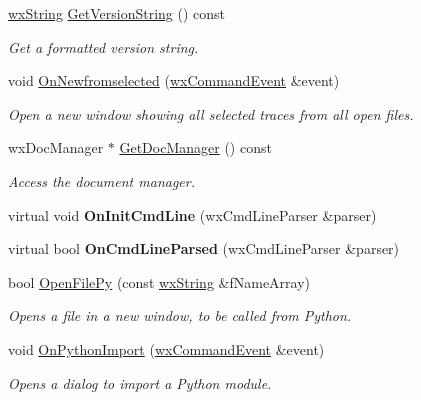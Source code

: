 \begin{DoxyCompactItemize}
\hyperlink{classwxString}{wxString} \hyperlink{classwxStfApp_a3e2dfcb798c3451a31b84ec712ae52fd}{GetVersionString} () const 
\begin{DoxyCompactList}\small\item\em Get a formatted version string. \item\end{DoxyCompactList}\item 
void \hyperlink{classwxStfApp_ad84ab3a7bc030ba2b1a03924f8e90386}{OnNewfromselected} (\hyperlink{classwxCommandEvent}{wxCommandEvent} \&event)
\begin{DoxyCompactList}\small\item\em Open a new window showing all selected traces from all open files. \item\end{DoxyCompactList}\item 
wxDocManager $\ast$ \hyperlink{classwxStfApp_a5fad31f2760593bec972912461e2e2e4}{GetDocManager} () const 
\begin{DoxyCompactList}\small\item\em Access the document manager. \item\end{DoxyCompactList}\item 
\hypertarget{classwxStfApp_a6a012628e86f748873c91ab039373fc8}{
virtual void {\bfseries OnInitCmdLine} (wxCmdLineParser \&parser)}
\label{classwxStfApp_a6a012628e86f748873c91ab039373fc8}

\item 
\hypertarget{classwxStfApp_a6bbcf577566590abb524e842692688c3}{
virtual bool {\bfseries OnCmdLineParsed} (wxCmdLineParser \&parser)}
\label{classwxStfApp_a6bbcf577566590abb524e842692688c3}

\item 
bool \hyperlink{classwxStfApp_ad8c1479a2b4e101482005d2cbae660bf}{OpenFilePy} (const \hyperlink{classwxString}{wxString} \&fNameArray)
\begin{DoxyCompactList}\small\item\em Opens a file in a new window, to be called from Python. \item\end{DoxyCompactList}\item 
void \hyperlink{classwxStfApp_aa5887b87ba6889cffc3c77b4f4b97b8c}{OnPythonImport} (\hyperlink{classwxCommandEvent}{wxCommandEvent} \&event)
\begin{DoxyCompactList}\small\item\em Opens a dialog to import a Python module. \item\end{DoxyCompactList}\end{DoxyCompactItemize}



